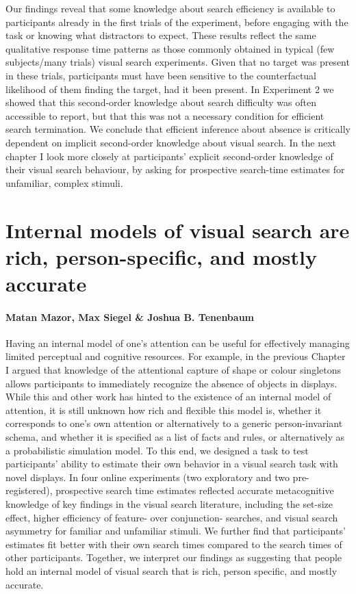 \documentclass[12pt,twoside]{reedthesis}
\begin{document}
Our findings reveal that some knowledge about search efficiency is available to participants already in the first trials of the experiment, before engaging with the task or knowing what distractors to expect. These results reflect the same qualitative response time patterns as those commonly obtained in typical (few subjects/many trials) visual search experiments. Given that no target was present in these trials, participants must have been sensitive to the counterfactual likelihood of them finding the target, had it been present. In Experiment 2 we showed that this second-order knowledge about search difficulty was often accessible to report, but that this was not a necessary condition for efficient search termination. We conclude that efficient inference about absence is critically dependent on implicit second-order knowledge about visual search. In the next chapter I look more closely at participants' explicit second-order knowledge of their visual search behaviour, by asking for prospective search-time estimates for unfamiliar, complex stimuli.

\hypertarget{ch-MVS}{%
\chapter{Internal models of visual search are rich, person-specific, and mostly accurate}\label{ch-MVS}}

\hypertarget{matan-mazor-max-siegel-joshua-b.-tenenbaum}{%
\subsubsection*{Matan Mazor, Max Siegel \& Joshua B. Tenenbaum}\label{matan-mazor-max-siegel-joshua-b.-tenenbaum}}

Having an internal model of one's attention can be useful for effectively managing limited perceptual and cognitive resources. For example, in the previous Chapter I argued that knowledge of the attentional capture of shape or colour singletons allows participants to immediately recognize the absence of objects in displays. While this and other work has hinted to the existence of an internal model of attention, it is still unknown how rich and flexible this model is, whether it corresponds to one's own attention or alternatively to a generic person-invariant schema, and whether it is specified as a list of facts and rules, or alternatively as a probabilistic simulation model. To this end, we designed a task to test participants' ability to estimate their own behavior in a visual search task with novel displays. In four online experiments (two exploratory and two pre-registered), prospective search time estimates reflected accurate metacognitive knowledge of key findings in the visual search literature, including the set-size effect, higher efficiency of feature- over conjunction- searches, and visual search asymmetry for familiar and unfamiliar stimuli. We further find that participants' estimates fit better with their own search times compared to the search times of other participants. Together, we interpret our findings as suggesting that people hold an internal model of visual search that is rich, person specific, and mostly accurate.
\end{document}
